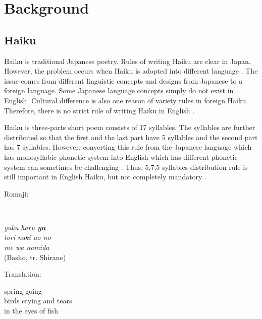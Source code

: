 

\section{Background}


\subsection{Haiku}


Haiku is traditional Japanese poetry. Rules of writing Haiku are clear in Japan. However, the problem occurs when Haiku is adopted into different language \cite{Haiku_poem}. The issue comes from different linguistic concepts and designs from Japanese to a foreign language. Some Japanese language concepts simply do not exist in English. Cultural difference is also one reason of variety rules in foreign Haiku. Therefore, there is no strict rule of writing Haiku in English \cite{Haiku_JP}.


Haiku is three-parts short poem consists of 17 syllables. The syllables are further distributed so that the first and the last part have 5 syllables and the second part has 7 syllables. However, converting this rule from the Japanese language which has monosyllabic phonetic system into English which has different phonetic system can sometimes be challenging  \cite{Haiku_poem}. Thus, 5,7,5 syllables distribution rule is still important in English Haiku, but not completely mandatory \cite{Haiku_JP}.



Romaji:

~\\
{\centering\textit{
yuku haru \textbf{ya} \\
tori naki uo no \\
me wa namida}  \\
(Basho, tr. Shirane)
\par
}


Translation:\\

{\centering

spring going\textbf{--} \\

birds crying and tears \\

in the eyes of fish

\par

}


~\\


